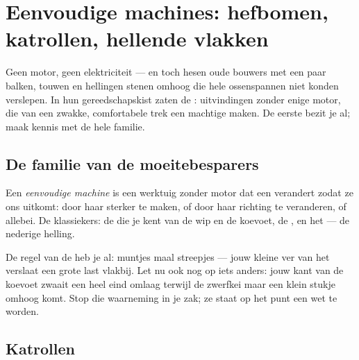 \chapter{Eenvoudige machines: hefbomen, katrollen, hellende vlakken}\label{ch:g5:simple-machines}

Geen motor, geen elektriciteit --- en toch hesen oude bouwers met een
paar balken, touwen en hellingen stenen omhoog die hele ossenspannen
niet konden verslepen. In hun gereedschapskist zaten de
\emph{}: uitvindingen zonder enige motor, die van
een zwakke, comfortabele trek een machtige maken. De eerste bezit je
al; maak kennis met de hele familie.

\section{De familie van de moeitebesparers}

\begin{definition}\label{def:g5:simple-machines:machine}
Een \emph{eenvoudige machine} is een
werktuig zonder motor dat een  verandert zodat ze ons uitkomt:
door haar sterker te maken, of door haar richting te veranderen, of
allebei. De klassiekers: de \emph{} die je kent van de wip en de
koevoet, de \emph{}, en het \emph{} --- de nederige
helling.
\end{definition}

\begin{example}\label{ex:g5:simple-machines:lever}
De regel van de  heb je al: muntjes maal streepjes --- jouw
kleine  ver van het  verslaat een grote last vlakbij.
Let nu ook nog op iets anders: jouw kant van de koevoet zwaait een
heel eind omlaag terwijl de zwerfkei maar een klein stukje omhoog
komt. Stop die waarneming in je zak; ze staat op het punt een wet te
worden.
\end{example}

\section{Katrollen}

